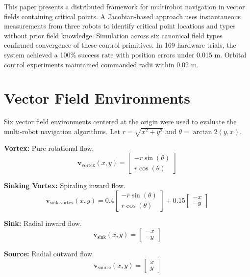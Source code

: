\documentclass[lettersize,journal]{IEEEtran}
\begin{document}
This paper presents a distributed framework for multirobot navigation in vector fields containing critical points. A Jacobian-based approach uses instantaneous measurements from three robots to identify critical point locations and types without prior field knowledge. Simulation across six canonical field types confirmed convergence of these control primitives. In 169 hardware trials, the system achieved a 100\% success rate with position errors under 0.015 m. Orbital control experiments maintained commanded radii within 0.02 m.


\appendices

\section{Vector Field Environments}
\label{sec:appendix_vector_fields}

Six vector field environments centered at the origin were used to evaluate the multi-robot navigation algorithms. Let $r = \sqrt{x^2 + y^2}$ and $\theta = \arctan2(y, x)$.

\textbf{Vortex:} Pure rotational flow.
\begin{equation}
\mathbf{v}_{\text{vortex}}(x, y) = \begin{bmatrix} -r \sin(\theta) \\ r \cos(\theta) \end{bmatrix}
\end{equation}

\textbf{Sinking Vortex:} Spiraling inward flow.
\begin{equation}
\mathbf{v}_{\text{sink-vortex}}(x, y) = 0.4 \begin{bmatrix} -r \sin(\theta) \\ r \cos(\theta) \end{bmatrix} + 0.15 \begin{bmatrix} -x \\ -y \end{bmatrix}
\end{equation}

\textbf{Sink:} Radial inward flow.
\begin{equation}
\mathbf{v}_{\text{sink}}(x, y) = \begin{bmatrix} -x \\ -y \end{bmatrix}
\end{equation}

\textbf{Source:} Radial outward flow.
\begin{equation}
\mathbf{v}_{\text{source}}(x, y) = \begin{bmatrix} x \\ y \end{bmatrix}
\end{equation}
\end{document}
